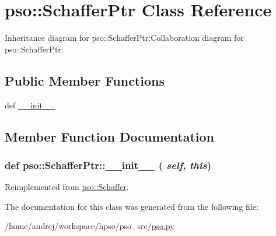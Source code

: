\hypertarget{classpso_1_1SchafferPtr}{
\section{pso::SchafferPtr Class Reference}
\label{classpso_1_1SchafferPtr}
}
Inheritance diagram for pso::SchafferPtr:Collaboration diagram for pso::SchafferPtr:\subsection*{Public Member Functions}
\begin{CompactItemize}
\item 
def \hyperlink{classpso_1_1SchafferPtr_ed11725f1cd7627f537b7daad5560125}{\_\-\_\-init\_\-\_\-}
\end{CompactItemize}


\subsection{Member Function Documentation}
\hypertarget{classpso_1_1SchafferPtr_ed11725f1cd7627f537b7daad5560125}{
\subsubsection{\setlength{\rightskip}{0pt plus 5cm}def pso::SchafferPtr::\_\-\_\-init\_\-\_\- ( {\em self}, \/   {\em this})}}
\label{classpso_1_1SchafferPtr_ed11725f1cd7627f537b7daad5560125}




Reimplemented from \hyperlink{classpso_1_1Schaffer_ff9f1ae937ff0d73aeb17bb27be9b5f3}{pso::Schaffer}.

The documentation for this class was generated from the following file:\begin{CompactItemize}
\item 
/home/andrej/workspace/hpso/pso\_\-src/\hyperlink{pso_8py}{pso.py}\end{CompactItemize}
